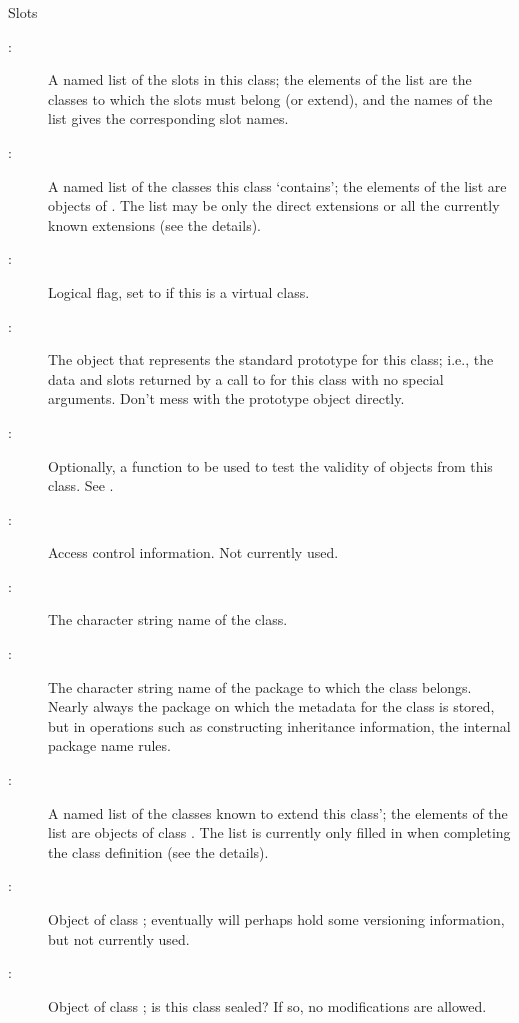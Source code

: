 %
\begin{Section}{Slots}
\begin{description}

\item[:] A named list of the slots in this class; the
elements of the list are the classes to which the slots must
belong (or extend), and the names of the list gives the
corresponding slot names.
\item[:] A named list of the classes this class
`contains'; the elements of the list are objects of
. The list may be only the
direct extensions or all the currently known extensions (see the
details).
\item[:] Logical flag, set to  if this is
a virtual class.
\item[:] The object that represents the standard
prototype for this class; i.e., the data and slots returned by a
call to  for this class with no special
arguments.  Don't mess with the prototype object directly.
\item[:] Optionally, a function to be used to test
the validity of objects from this class.
See .
\item[:] Access control information.  Not currently used.
\item[:] The character string name of the class.
\item[:] The character string name of the package to
which the class belongs.  Nearly always the package on which the
metadata for the class is stored, but in operations such as
constructing inheritance information, the internal package name
rules.
\item[:] A named list of the classes known to
extend this class'; the elements of the list are objects of class
.  The list is currently only
filled in when completing the class definition (see the details).
\item[:] Object of class ;
eventually will perhaps hold some versioning information, but not
currently used. 
\item[:] Object of class ; is this
class sealed?  If so, no modifications are allowed. 

\end{description}

\end{Section}

